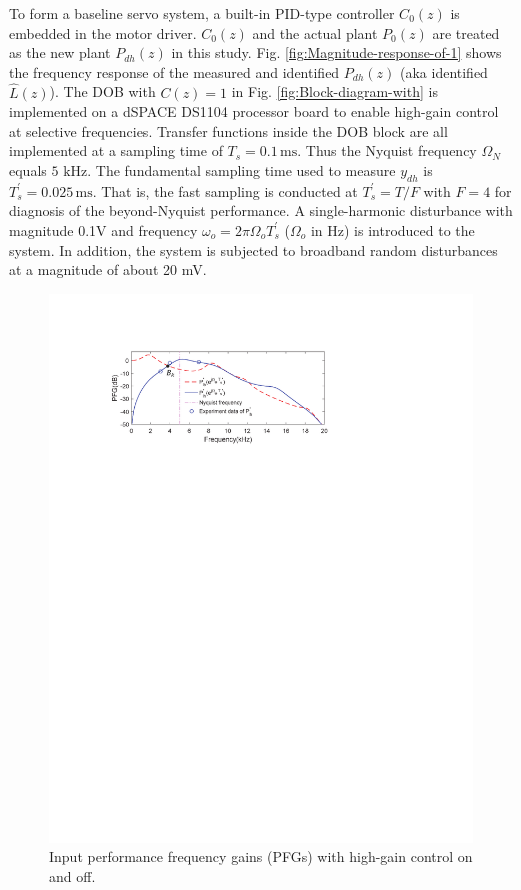 \documentclass [11pt, proquest] {uwthesis}[2020/02/24]
\begin{document}
To form a baseline servo system, a built-in PID-type controller $C_{0}(z)$
is embedded in the motor driver. $C_{0}(z)$ and the actual plant
$P_{0}(z)$ are treated as the new plant $P_{dh}(z)$ in this study.
Fig. \ref{fig:Magnitude-response-of-1} shows the frequency response of the measured
and identified $P_{dh}(z)$ (aka identified $\hat{L}(z)$). The DOB \cite{XuChen_TCST2012} with
$C(z)=1$ in Fig. \ref{fig:Block-diagram-with} is implemented on
a dSPACE DS1104 processor board to enable high-gain control at selective
frequencies. Transfer functions inside the DOB block are all implemented
at a sampling time of $T_{s}=0.1\,\text{ms}$. Thus the Nyquist frequency
$\Omega_{N}$ equals $5\text{ kHz}$. The fundamental sampling time
used to measure $y_{dh}$ is $T_{s}^{'}=0.025\,\text{ms}$. That is,
the fast sampling is conducted at $T_{s}^{'}=T/F$ with $F=4$ for
diagnosis of the beyond-Nyquist performance. A single-harmonic disturbance
with magnitude 0.1V and frequency $\omega_{o}=2\pi\Omega_{o}T_{s}^{'}$
($\Omega_{o}$ in Hz) is introduced to the system. In addition, the
system is subjected to broadband random disturbances at a magnitude
of about 20 mV.
\begin{figure}[!ht]
\begin{centering}
\includegraphics[width=13cm]{Spectral-analysis/FIG16.pdf}
\par\end{centering}
\caption{\label{fig:Performace-frequency-gain-1}Input performance frequency
gains (PFGs) with high-gain control on and off.}
\end{figure}
\end{document}
